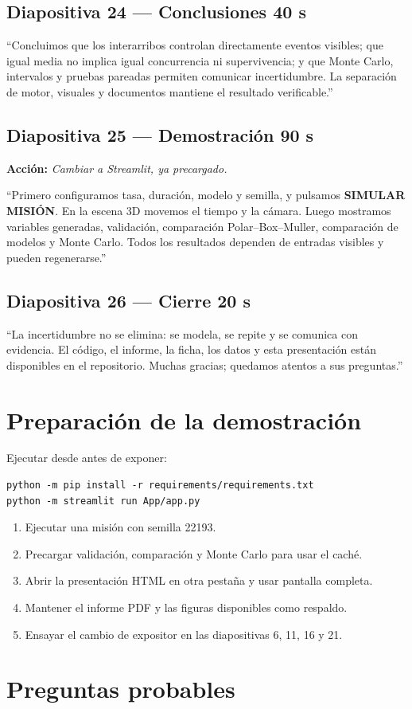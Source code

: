 \documentclass[11pt,a4paper]{article}
\newcommand{\slidecue}[4]{%
  \subsection*{\textcolor{outbreakgreen}{Diapositiva #1 --- #2}\hfill
  \normalfont\small #3}
  \noindent\colorbox{outbreakpale}{\parbox{\dimexpr\textwidth-2\fboxsep}{#4}}
  \vspace{0.45em}}
\newcommand{\stage}[1]{\textbf{\textcolor{outbreakamber}{Acción:}} \emph{#1}\par}
\begin{document}
\slidecue{24}{Conclusiones}{40 s}{
``Concluimos que los interarribos controlan directamente eventos visibles; que
igual media no implica igual concurrencia ni supervivencia; y que Monte Carlo,
intervalos y pruebas pareadas permiten comunicar incertidumbre. La separación
de motor, visuales y documentos mantiene el resultado verificable.''
}

\slidecue{25}{Demostración}{90 s}{
\stage{Cambiar a Streamlit, ya precargado.}
``Primero configuramos tasa, duración, modelo y semilla, y pulsamos
\textbf{SIMULAR MISIÓN}. En la escena 3D movemos el tiempo y la cámara. Luego
mostramos variables generadas, validación, comparación Polar--Box--Muller,
comparación de modelos y Monte Carlo. Todos los resultados dependen de entradas
visibles y pueden regenerarse.''
}

\slidecue{26}{Cierre}{20 s}{
``La incertidumbre no se elimina: se modela, se repite y se comunica con
evidencia. El código, el informe, la ficha, los datos y esta presentación están
disponibles en el repositorio. Muchas gracias; quedamos atentos a sus
preguntas.''
}

\section*{Preparación de la demostración}

Ejecutar desde  antes de exponer:

\begin{verbatim}
python -m pip install -r requirements/requirements.txt
python -m streamlit run App/app.py
\end{verbatim}

\begin{enumerate}
  \item Ejecutar una misión con semilla 22193.
  \item Precargar validación, comparación y Monte Carlo para usar el caché.
  \item Abrir la presentación HTML en otra pestaña y usar pantalla completa.
  \item Mantener el informe PDF y las figuras disponibles como respaldo.
  \item Ensayar el cambio de expositor en las diapositivas 6, 11, 16 y 21.
\end{enumerate}

\section*{Preguntas probables}
\end{document}
